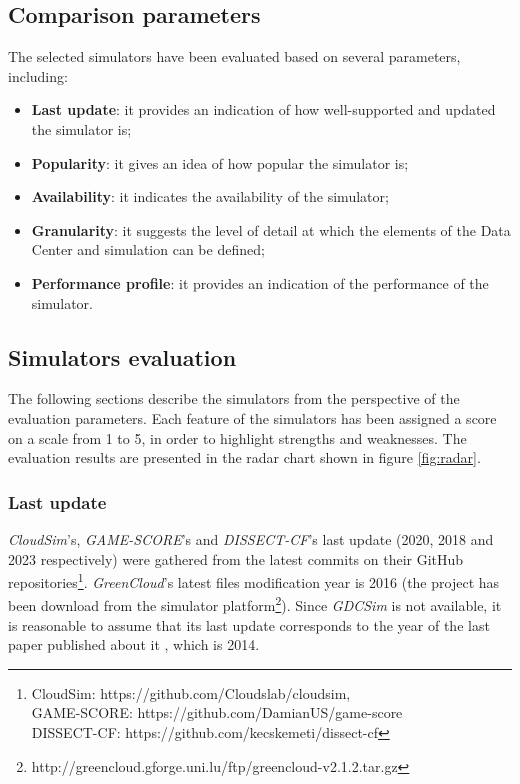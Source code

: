 {\subsection{Comparison parameters}
The selected simulators have been evaluated based on several parameters, including:
\begin{itemize}
    \item \textbf{Last update}: it provides an indication of how well-supported and updated the simulator is; 
    \item \textbf{Popularity}: it gives an idea of how popular the simulator is; 
    \item \textbf{Availability}: it indicates the availability of the simulator;
    \item \textbf{Granularity}: it suggests the level of detail at which the elements of the Data Center and simulation can be defined; 
    \item \textbf{Performance profile}: it provides an indication of the performance of the simulator.
\end{itemize}

\subsection{Simulators evaluation}
The following sections describe the simulators from the perspective of the evaluation parameters. Each feature of the simulators has been assigned a score on a scale from 1 to 5, in order to highlight strengths and weaknesses. The evaluation results are presented in the radar chart shown in figure \ref{fig:radar}.

\subsubsection{Last update}
\emph{CloudSim}'s, \emph{GAME-SCORE}'s and \emph{DISSECT-CF}'s last update (2020, 2018 and 2023 respectively) were gathered from the latest commits on their GitHub repositories\footnote{CloudSim: https://github.com/Cloudslab/cloudsim,\\ GAME-SCORE: https://github.com/DamianUS/game-score \\ DISSECT-CF: https://github.com/kecskemeti/dissect-cf}. \emph{GreenCloud}'s latest files modification year is 2016 (the project has been download from the simulator platform\footnote{http://greencloud.gforge.uni.lu/ftp/greencloud-v2.1.2.tar.gz}). Since \emph{GDCSim} is not available, it is reasonable to assume that its last update corresponds to the year of the last paper published about it \cite{gdcsim_latest}, which is 2014.

}
